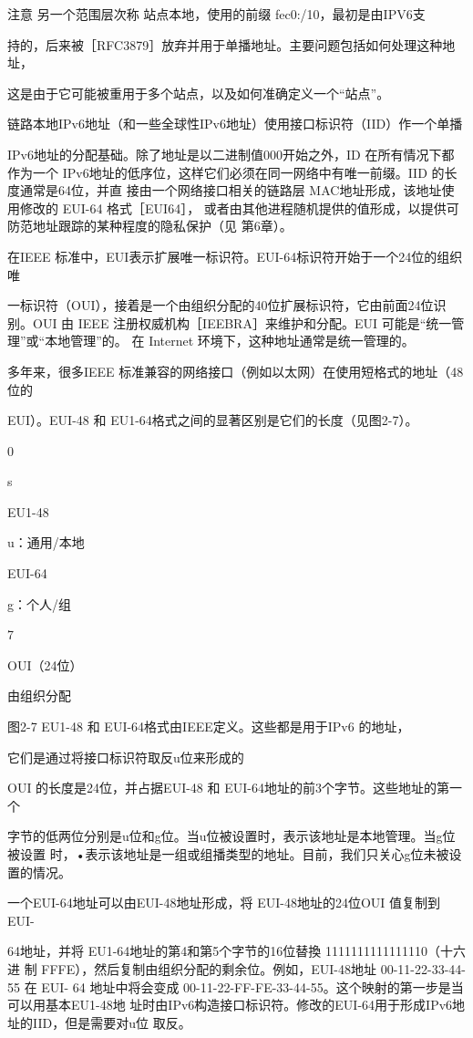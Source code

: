 注意 另一个范围层次称 站点本地，使用的前缀 fec0:/10，最初是由IPV6支

持的，后来被［RFC3879］放弃并用于单播地址。主要问题包括如何处理这种地址，

这是由于它可能被重用于多个站点，以及如何准确定义一个“站点”。

链路本地IPv6地址（和一些全球性IPv6地址）使用接口标识符（IID）作一个单播

IPv6地址的分配基础。除了地址是以二进制值000开始之外，ID 在所有情况下都作为一个
IPv6地址的低序位，这样它们必须在同一网络中有唯一前缀。IID 的长度通常是64位，并直
接由一个网络接口相关的链路层 MAC地址形成，该地址使用修改的 EUI-64 格式［EUI64］，
或者由其他进程随机提供的值形成，以提供可防范地址跟踪的某种程度的隐私保护（见
第6章）。

在IEEE 标准中，EUI表示扩展唯一标识符。EUI-64标识符开始于一个24位的组织唯

一标识符（OUI），接着是一个由组织分配的40位扩展标识符，它由前面24位识别。OUI 由
IEEE 注册权威机构［IEEBRA］来维护和分配。EUI 可能是“统一管理”或“本地管理”的。
在 Internet 环境下，这种地址通常是统一管理的。

多年来，很多IEEE 标准兼容的网络接口（例如以太网）在使用短格式的地址（48位的

EUI）。EUI-48 和 EU1-64格式之间的显著区别是它们的长度（见图2-7）。

0

s

EU1-48

u：通用/本地

EUI-64

g：个人/组

7

OUI（24位）

由组织分配

图2-7 EU1-48 和 EUI-64格式由IEEE定义。这些都是用于IPv6 的地址，

它们是通过将接口标识符取反u位来形成的

OUI 的长度是24位，并占据EUI-48 和 EUI-64地址的前3个字节。这些地址的第一个

字节的低两位分别是u位和g位。当u位被设置时，表示该地址是本地管理。当g位被设置
时，•表示该地址是一组或组播类型的地址。目前，我们只关心g位未被设置的情况。

一个EUI-64地址可以由EUI-48地址形成，将 EUI-48地址的24位OUI 值复制到 EUI-

64地址，并将 EU1-64地址的第4和第5个字节的16位替換 1111111111111110（十六进
制 FFFE），然后复制由组织分配的剩余位。例如，EUI-48地址 00-11-22-33-44-55 在 EUI-
64 地址中将会变成 00-11-22-FF-FE-33-44-55。这个映射的第一步是当可以用基本EU1-48地
址时由IPv6构造接口标识符。修改的EUI-64用于形成IPv6地址的IID，但是需要对u位
取反。

